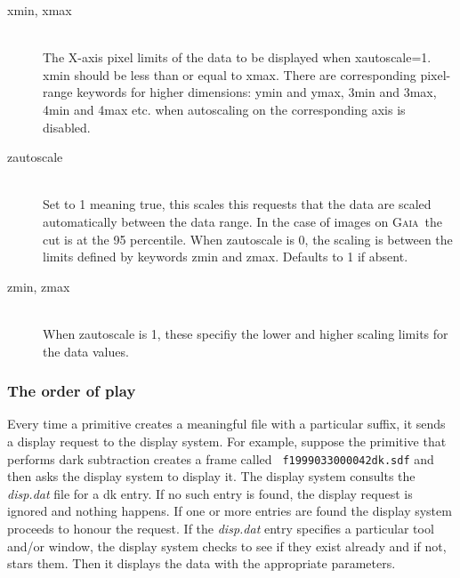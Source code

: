 \documentclass[twoside,11pt]{article}
\newcommand{\xref}[3]{#1}
\renewcommand{\_}{\texttt{\symbol{95}}}
\def\C++{{\rm C\kern-.05em\raise.3ex\hbox{\footnotesize ++}}}
\newcommand{\underscore}{\_}
\newcommand{\gaia}{\xref{{\textsc{Gaia}}}{sun214}{}}
\begin{document}
\begin{description}
\item[xmin, xmax]
\hfil\\
The X-axis pixel limits of the data to be displayed when xautoscale=1.
xmin should be less than or equal to xmax.  There are corresponding
pixel-range keywords for higher dimensions: ymin and ymax, 3min and
3max, 4min and 4max etc. when autoscaling on the corresponding axis is
disabled.

\item[zautoscale]
\hfil\\
Set to 1 meaning true, this scales this requests that the data are
scaled automatically between the data range.  In the case of images on
\gaia\ the cut is at the 95 percentile.  When zautoscale is 0, the
scaling is between the limits defined by keywords zmin and zmax.
Defaults to 1 if absent.

\item[zmin, zmax]
\hfil\\
When zautoscale is 1, these specifiy the lower and higher 
scaling limits for the data values.

\end{description}

\subsubsection*{The order of play}

Every time a primitive creates a meaningful file with a particular suffix, it
sends a display request to the display system. For example, suppose the
primitive that performs dark subtraction creates a frame called {\tt
f19990330\underscore{}00042\underscore{}dk.sdf\/} and then asks the display
system to display it. The display system consults the {\em disp.dat\/} file
for a dk entry. If no such entry is found, the display request is ignored and
nothing happens. If one or more entries are found the display system proceeds
to honour the request. If the {\em disp.dat\/} entry specifies a particular
tool and/or window, the display system checks to see if they exist already and
if not, stars them. Then it displays the data with the appropriate parameters.


\end{document}
